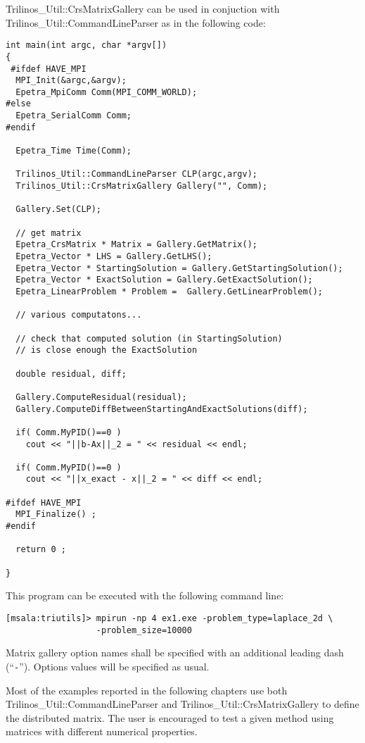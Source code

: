 Trilinos\_Util::CrsMatrixGallery can be used in conjuction with
Trilinos\_Util::CommandLineParser as in the following code:
\begin{verbatim}
int main(int argc, char *argv[]) 
{
 #ifdef HAVE_MPI
  MPI_Init(&argc,&argv);
  Epetra_MpiComm Comm(MPI_COMM_WORLD);
#else
  Epetra_SerialComm Comm;
#endif

  Epetra_Time Time(Comm);

  Trilinos_Util::CommandLineParser CLP(argc,argv);
  Trilinos_Util::CrsMatrixGallery Gallery("", Comm);

  Gallery.Set(CLP);

  // get matrix
  Epetra_CrsMatrix * Matrix = Gallery.GetMatrix();
  Epetra_Vector * LHS = Gallery.GetLHS();
  Epetra_Vector * StartingSolution = Gallery.GetStartingSolution();
  Epetra_Vector * ExactSolution = Gallery.GetExactSolution();
  Epetra_LinearProblem * Problem =  Gallery.GetLinearProblem();

  // various computatons...

  // check that computed solution (in StartingSolution) 
  // is close enough the ExactSolution

  double residual, diff;

  Gallery.ComputeResidual(residual);
  Gallery.ComputeDiffBetweenStartingAndExactSolutions(diff);
  
  if( Comm.MyPID()==0 ) 
    cout << "||b-Ax||_2 = " << residual << endl;

  if( Comm.MyPID()==0 ) 
    cout << "||x_exact - x||_2 = " << diff << endl;

#ifdef HAVE_MPI
  MPI_Finalize() ;
#endif

  return 0 ;

}
\end{verbatim}
This program can be executed with the following command line:
\begin{verbatim}
[msala:triutils]> mpirun -np 4 ex1.exe -problem_type=laplace_2d \
                  -problem_size=10000
\end{verbatim}
Matrix gallery option names shall be specified with an additional
leading dash (``\verb!-!''). Options values will be specified as usual.

\begin{remark}
  Most of the examples reported in the following chapters use both\newline
  Trilinos\_Util::CommandLineParser and Trilinos\_Util::CrsMatrixGallery
  to define the distributed matrix. The user is encouraged to test a
  given method using matrices with different numerical properties.
\end{remark}

